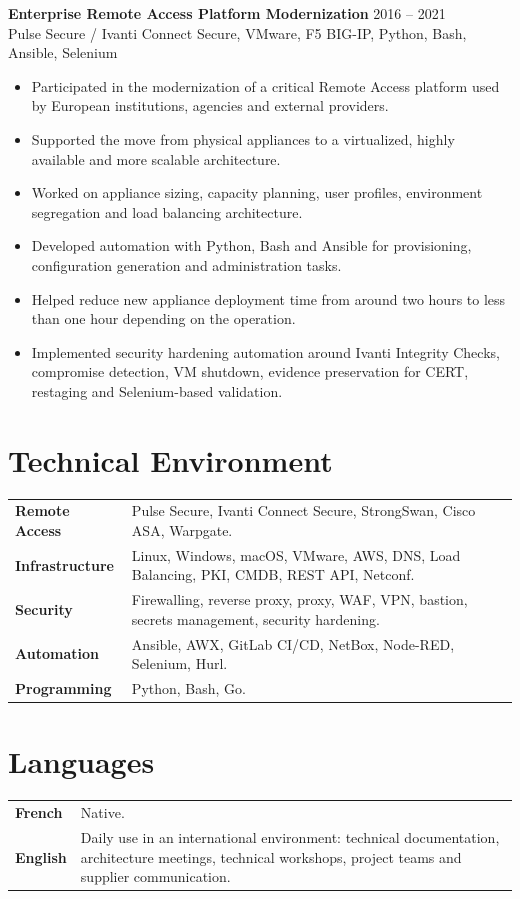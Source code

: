 \documentclass[10pt,a4paper]{article}
\newcommand{\project}[3]{
  \textbf{#1} \hfill {\color{muted}#2}\\
  {\color{muted}#3}
}
\begin{document}
\vspace{4pt}
\project{Enterprise Remote Access Platform Modernization}{2016 -- 2021}{Pulse Secure / Ivanti Connect Secure, VMware, F5 BIG-IP, Python, Bash, Ansible, Selenium}
\begin{itemize}
  \item Participated in the modernization of a critical Remote Access platform used by European institutions, agencies and external providers.
  \item Supported the move from physical appliances to a virtualized, highly available and more scalable architecture.
  \item Worked on appliance sizing, capacity planning, user profiles, environment segregation and load balancing architecture.
  \item Developed automation with Python, Bash and Ansible for provisioning, configuration generation and administration tasks.
  \item Helped reduce new appliance deployment time from around two hours to less than one hour depending on the operation.
  \item Implemented security hardening automation around Ivanti Integrity Checks, compromise detection, VM shutdown, evidence preservation for CERT, restaging and Selenium-based validation.
\end{itemize}

\section{Technical Environment}

\begin{tabularx}{\textwidth}{@{}>{\bfseries}p{3.3cm}X@{}}
Remote Access & Pulse Secure, Ivanti Connect Secure, StrongSwan, Cisco ASA, Warpgate.\\
Infrastructure & Linux, Windows, macOS, VMware, AWS, DNS, Load Balancing, PKI, CMDB, REST API, Netconf.\\
Security & Firewalling, reverse proxy, proxy, WAF, VPN, bastion, secrets management, security hardening.\\
Automation & Ansible, AWX, GitLab CI/CD, NetBox, Node-RED, Selenium, Hurl.\\
Programming & Python, Bash, Go.\\
\end{tabularx}

\section{Languages}

\begin{tabularx}{\textwidth}{@{}>{\bfseries}p{3.3cm}X@{}}
French & Native.\\
English & Daily use in an international environment: technical documentation, architecture meetings, technical workshops, project teams and supplier communication.\\
\end{tabularx}
\end{document}
